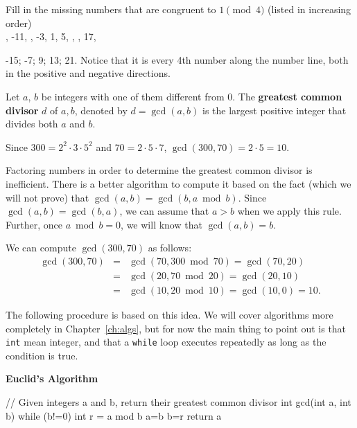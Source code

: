 \begin{exer}
Fill in the missing numbers that are congruent to $1\pmod 4$ (listed in increasing order)\\
, -11, , -3, 1, 5, , , 17, 
\begin{answer}
-15; -7; 9; 13; 21.  Notice that it is every 4th number along the number line, both in the
positive and negative directions.
\end{answer}
\end{exer}

\begin{df}
Let  $a$, $b$ be integers with one of them different from $0$. The
{\bf greatest common divisor} $d$ of $a, b$, denoted by $d = \gcd(a, b)$
is the largest positive integer that divides both $a$ and $b$.
\end{df}

\begin{exa}
Since $300=2^2\cdot 3\cdot 5^2$ and $70=2\cdot 5\cdot 7$, 
$\gcd(300,70)=2\cdot 5=10.$
\end{exa}

Factoring numbers in order to determine the greatest common divisor is
inefficient. There is a better algorithm to compute it based on the fact (which we will not prove) that $\gcd(a,b)=\gcd(b,a\bmod b)$. 
Since $\gcd(a,b)=\gcd(b,a)$, we can assume that $a>b$ when we apply this rule.
Further, once $a\bmod b=0$, we will know that $\gcd(a,b)=b$.

\begin{exa}
We can compute $\gcd(300,70)$ as follows:
$$
\begin{array}{lll}
\gcd(300,70)
&=&\gcd(70,300\bmod 70)=\gcd(70,20)\\
&=&\gcd(20,70\bmod 20)=\gcd(20,10)\\
&=&\gcd(10,20\bmod 10)=\gcd(10,0)=10.
\end{array}$$
\end{exa}

The following procedure is based on this idea.
We will cover algorithms more completely in
Chapter~\ref{ch:algs}, but for now the main
thing to point out is that \verb+int+ mean integer,
and that a \verb+while+ loop executes repeatedly as long as the condition 
is true.

\begin{proc}\label{proc:euclid}
{\bf Euclid's Algorithm}
\begin{code}
// Given integers a and b, return their greatest common divisor
int gcd(int a, int b) {
    while (b!=0) {
        int r = a mod b
        a=b
        b=r
    }
    return a
}
\end{code}
\end{proc}

